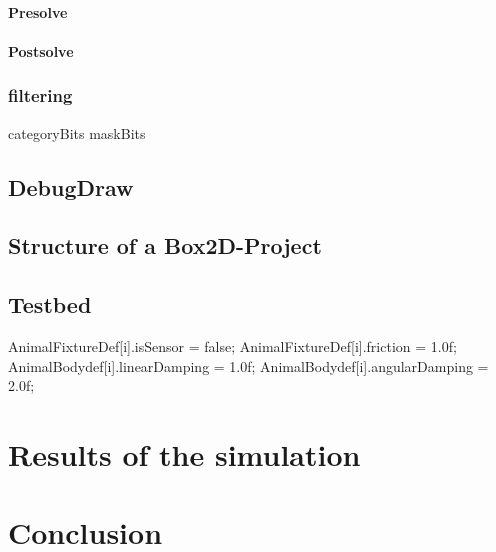 \documentclass[10pt,a4paper,DIV=11]{scrreprt}
\begin{document}
\subsubsection*{Presolve}

\subsubsection*{Postsolve}


\subsection{filtering}
categoryBits
maskBits


\section{DebugDraw}


\section{Structure of a Box2D-Project}




\section{Testbed}


    AnimalFixtureDef[i].isSensor = false;
    AnimalFixtureDef[i].friction = 1.0f;
    AnimalBodydef[i].linearDamping = 1.0f;
    AnimalBodydef[i].angularDamping = 2.0f;


\chapter{Results of the simulation}

\chapter{Conclusion}





\newpage


\listoffigures
\listoftables
\listofalgorithms
\lstlistoflistings

\newpage











\end{document}
